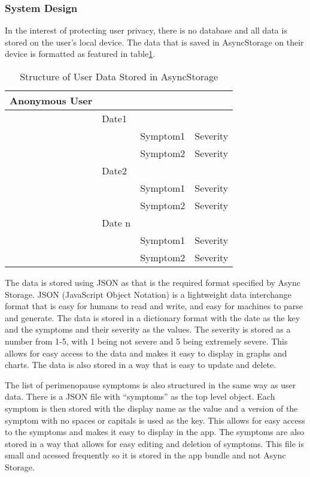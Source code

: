 \subsubsection{System Design}
In the interest of protecting user privacy, there is no database and all data is stored on the user's local device. The data that is saved in AsyncStorage on their device is formatted as featured in table\ref{table:user-data}. 
\begin{table}[h!!]
    \caption{Structure of User Data Stored in AsyncStorage}
    \label{table:user-data}
    \begin{tabular}{llll}
    \hline
    Anonymous User &        &          &          \\ \hline
                  & Date1  &          &          \\
                  &        & Symptom1 & Severity \\
                  &        & Symptom2 & Severity \\
                  & Date2  &          &          \\
                  &        & Symptom1 & Severity \\
                  &        & Symptom2 & Severity \\
                  & Date n &          &          \\
                  &        & Symptom1 & Severity \\
                  &        & Symptom2 & Severity \\ \hline
  \end{tabular}
\end{table}

The data is stored using JSON as that is the required format specified by Async Storage. JSON (JavaScript Object Notation) is a lightweight data interchange format that is easy for humans to read and write, and easy for machines to parse and generate\cite{JSON2025}. The data is stored in a dictionary format with the date as the key and the symptoms and their severity as the values. The severity is stored as a number from 1-5, with 1 being not severe and 5 being extremely severe. This allows for easy access to the data and makes it easy to display in graphs and charts. The data is also stored in a way that is easy to update and delete.

The list of perimenopause symptoms is also structured in the same way as user data. There is a JSON file with ``symptoms'' as the top level object. Each symptom is then stored with the display name as the value and a version of the symptom with no spaces or capitals is used as the key. This allows for easy access to the symptoms and makes it easy to display in the app. The symptoms are also stored in a way that allows for easy editing and deletion of symptoms. This file is small and acessed frequently so it is stored in the app bundle and not Async Storage.

